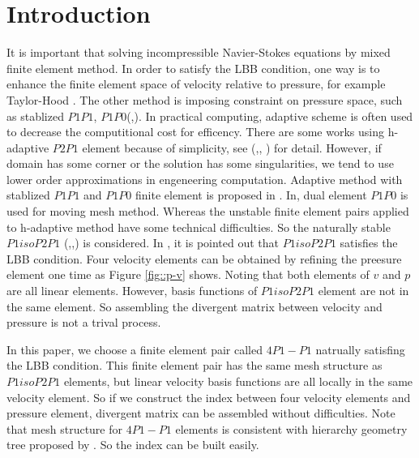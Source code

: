 \documentclass[a4paper, 11pt]{article}
\begin{document}
\section{Introduction}

    It is important that solving incompressible
    Navier-Stokes equations by mixed finite element method. In order to
    satisfy the LBB condition, one way is to enhance the finite
    element space of velocity relative to pressure, for example 
    Taylor-Hood \cite{taylor1974navier}. The other method is imposing
    constraint on pressure space, such as stablized $P1P1$,
    $P1P0$(\cite{li2009performance},\cite{bochev2006stabilization}). 
    In practical computing, adaptive scheme is often used to decrease the
    computitional cost for efficency. There are some works
    using h-adaptive $P2P1$ element because of simplicity, see
    (\cite{danaila2014newton},\cite{ebeida2009unsteady},
    \cite{berrone2009space}) for detail. However, if domain has some
    corner or the solution has some singularities, we tend to use lower
    order approximations in engeneering computation. Adaptive method with
    stablized $P1P1$ and $P1P0$ finite element is proposed in
    \cite{zheng2010posteriori}. In\cite{di2005moving},
    dual element $P1P0$ is used for moving mesh method. Whereas the
    unstable finite element pairs applied to h-adaptive method have some
    technical difficulties. So the naturally stable $P1isoP2P1$
    (\cite{vanden2009kinetic},\cite{fujima1998iso},\cite{bercovier1979error})
    is considered. In \cite{bercovier1979error}, it is pointed out that
    $P1isoP2P1$  satisfies the LBB condition. Four velocity
    elements can be obtained by refining the preesure element one
    time as Figure \ref{fig::p-v} shows. Noting that both elements of
    $v$ and $p$ are all linear elements. However, basis functions of
    $P1isoP2P1$ element are not in the same element. So
    assembling the divergent matrix between velocity and pressure is
    not a trival process. 
    
    In this paper, we choose a finite element pair called $4P1-P1$
    natrually satisfing the LBB condition. This finite element
    pair has the same mesh structure as $P1isoP2P1$ elements, but
    linear velocity basis functions are all locally in the same velocity
    element. So if we construct the index between four velocity
    elements and pressure element, divergent matrix can be assembled
    without difficulties. Note that mesh structure for $4P1-P1$ elements is
    consistent with hierarchy geometry tree proposed by
    \cite{li2005multi}. So the index can be built easily.
\end{document}
